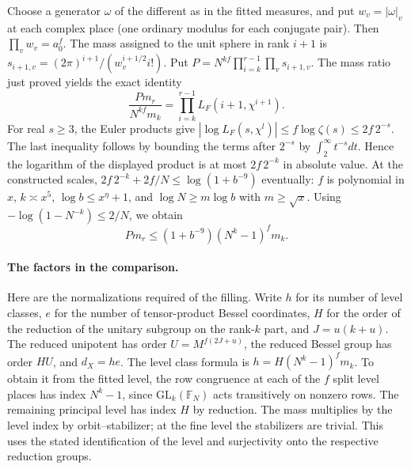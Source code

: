 Choose a generator \(\omega\) of the different as in the fitted
measures, and put \(w_v=|\omega|_v\) at each complex place
(one ordinary modulus for each conjugate pair). Then
\(\prod_v w_v=a_0^f\). The mass assigned to the unit sphere in
rank \(i+1\) is
\(s_{i+1,v}=(2\pi)^{i+1}/(w_v^{i+1/2}i!)\).
Put \(P=N^{kf}\prod_{i=k}^{r-1}\prod_v s_{i+1,v}\).
The mass ratio just proved yields the exact identity
\[
 \frac{P m_r}{N^{kf}m_k}
   =\prod_{i=k}^{r-1} L_F(i+1,\chi^{i+1}).
\]
For real \(s\ge3\), the Euler products give
\( |\log L_F(s,\chi^l)|\le f\log\zeta(s)\le 2f\,2^{-s}\).
The last inequality follows by bounding the terms after \(2^{-s}\)
by \(\int_2^\infty t^{-s}dt\). Hence the logarithm of the displayed
product is at most \(2f\,2^{-k}\) in absolute value.
At the constructed scales, \(2f\,2^{-k}+2f/N\le \log(1+b^{-9})\)
eventually: \(f\) is polynomial in \(x\), \(k\asymp x^5\),
\(\log b\le x^\eta+1\), and \(\log N\ge m\log b\) with
\(m\ge\sqrt{x}\).
Using \(-\log(1-N^{-k})\le 2/N\), we obtain
\begin{equation}\label{spread:frame}
 Pm_r\le (1+b^{-9})(N^k-1)^f m_k .
\end{equation}

\paragraph{The factors in the comparison.}
Here are the normalizations required of the filling. Write \(h\) for
its number of level classes, \(e\) for the number of tensor-product
Bessel coordinates, \(H\) for the order of the reduction of the
unitary subgroup on the rank-\(k\) part, and \(J=u(k+u)\).
The reduced unipotent has order \(U=M^{f(2J+u)}\), the reduced
Bessel group has order \(HU\), and \(d_X=he\). The level class
formula is \(h=H(N^k-1)^f m_k\). To obtain it from the fitted
level, the row congruence at each of the \(f\) split level places
has index \(N^k-1\), since \(\mathrm{GL}_k(\mathbb F_N)\) acts
transitively on nonzero rows. The remaining principal level
has index \(H\) by reduction. The mass multiplies by the level
index by orbit--stabilizer; at the fine level the stabilizers
are trivial. This uses the stated identification of the level
and surjectivity onto the respective reduction groups.

